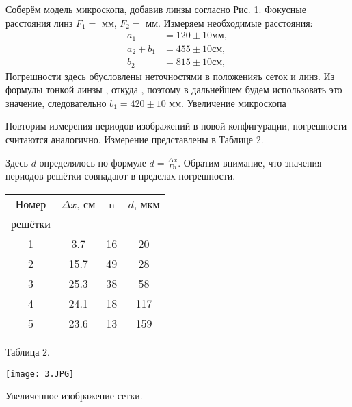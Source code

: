 \documentclass{article}
\begin{document}
Соберём модель микроскопа, добавив линзы согласно Рис. 1. Фокусные расстояния линз $F_{1}=  $ мм, $F_{2}= $ мм. Измеряем необходимые расстояния:
$$
\begin{aligned}
a_{1} &= 120  \pm 10 \mathrm{мм}, \\
a_{2}+b_{1} &= 455 \pm 10 \mathrm{см}, \\
b_{2} &= 815 \pm 10 \mathrm{см},
\end{aligned}
$$
Погрешности здесь обусловлены неточностями в положенияъ сеток и линз. Из формулы тонкой линзы , откуда , поэтому в дальнейшем будем использовать это значение, следовательно $b_{1}= 420\pm 10$ мм.  Увеличение микроскопа 

Повторим измерения периодов изображений в новой конфигурации, погрешности считаются аналогично. Измерение представлены в Таблице $2 .$

Здесь $d$ определялось по формуле $d=\frac{\Delta x}{\Gamma n}$. Обратим внимание, что значения периодов решётки совпадают в пределах погрешности.

\begin{minipage}{0.47\textwidth}
\begin{center}
\begin{tabular}{|c|c|c|c|}
\hline
Номер &$\Delta x$, см &  n&$d$, мкм\\
решётки&		&			& \\
\hline
1 &	3.7	&	16	& 	20		\\
\hline
2&	15.7	&	49	&	28		\\
\hline
3&	25.3	&	38	&	58		\\
\hline
4&	24.1	&	18	&	117		\\
\hline
5&	23.6	&	13	&	159	 	\\
\hline
\end{tabular}
\newline
\newline
Таблица 2.
\end{center}
\end{minipage}
\begin{minipage}{0.47\textwidth}
\begin{center}
\texttt{[image: 3.JPG]}
\end{center}

\begin{center}
Увеличенное изображение сетки.
\end{center}
\end{minipage}
\end{document}
